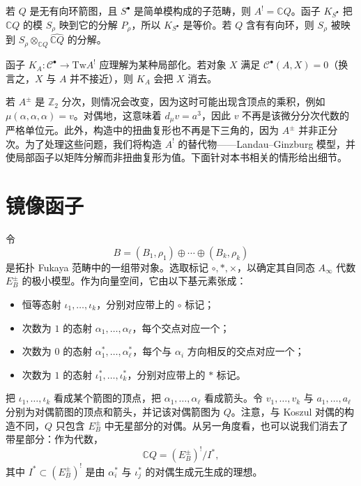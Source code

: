 \begin{example}
若 $Q$ 是无有向环箭图，且 $S^{\bullet}$ 是简单模构成的子范畴，则 $A^!=\mathbb C Q$。函子 $K_{S^{\bullet}}$ 把 $\mathbb C Q$ 的模 $S_\rho$ 映到它的分解 $P_\rho$，所以 $K_{S^{\bullet}}$ 是等价。若 $Q$ 含有有向环，则 $S_\rho$ 被映到 $S_\rho\otimes_{\mathbb C Q}\widehat{\mathbb C Q}$ 的分解。
\end{example}

\begin{note}[局部化视角]
函子 $K_A:\mathcal C^{\bullet}\to\mathrm{Tw}A^!$ 应理解为某种局部化。若对象 $X$ 满足 $\mathcal C^{\bullet}(A,X)=0$（换言之，$X$ 与 $A$ 并不接近），则 $K_A$ 会把 $X$ 消去。

若 $A^{\pm}$ 是 $\mathbb Z_2$ 分次，则情况会改变，因为这时可能出现含顶点的乘积，例如 $\mu(\alpha,\alpha,\alpha)=v$。对偶地，这意味着 $d_\mu v=a^3$，因此 $v$ 不再是该微分分次代数的严格单位元。此外，构造中的扭曲复形也不再是下三角的，因为 $A^{\pm}$ 并非正分次。为了处理这些问题，我们将构造 $A^!$ 的替代物——Landau--Ginzburg 模型，并使局部函子以矩阵分解而非扭曲复形为值。下面针对本书相关的情形给出细节。
\end{note}

\section{镜像函子}\label{sec:mirror-functor}

令
\[
  B=(B_1,\rho_1)\oplus\cdots\oplus(B_k,\rho_k)
\]
是拓扑 Fukaya 范畴中的一组带对象。选取标记 $\circ,\ast,\times$，以确定其自同态 $A_\infty$ 代数 $E_B^{\pm}$ 的极小模型。作为向量空间，它由以下基元素张成：
\begin{itemize}
  \item 恒等态射 $\iota_1,\ldots,\iota_k$，分别对应带上的 $\circ$ 标记；
  \item 次数为 $1$ 的态射 $\alpha_1,\ldots,\alpha_\ell$，每个交点对应一个；
  \item 次数为 $0$ 的态射 $\alpha_1^*,\ldots,\alpha_\ell^*$，每个与 $\alpha_i$ 方向相反的交点对应一个；
  \item 次数为 $1$ 的态射 $\iota_1^*,\ldots,\iota_k^*$，分别对应带上的 $\ast$ 标记。
\end{itemize}
把 $\iota_1,\ldots,\iota_k$ 看成某个箭图的顶点，把 $\alpha_1,\ldots,\alpha_\ell$ 看成箭头。令 $v_1,\ldots,v_k$ 与 $a_1,\ldots,a_\ell$ 分别为对偶箭图的顶点和箭头，并记该对偶箭图为 $Q$。注意，与 Koszul 对偶的构造不同，$Q$ 只包含 $E_B^{\pm}$ 中无星部分的对偶。从另一角度看，也可以说我们消去了带星部分：作为代数，
\[
  \mathbb C Q=(E_B^{\pm})^!/I^*,
\]
其中 $I^*\subset(E_B^{\pm})^!$ 是由 $\alpha_i^*$ 与 $\iota_j^*$ 的对偶生成元生成的理想。

